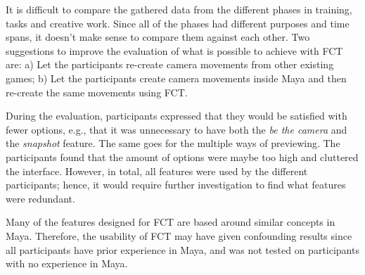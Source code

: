 It is difficult to compare the gathered data from the different phases in training, tasks and creative work. Since all of the phases had different purposes and time spans, it doesn't make sense to compare them against each other. Two suggestions to improve the evaluation of what is possible to achieve with FCT are: a) Let the participants re-create camera movements from other existing games; b) Let the participants create camera movements inside Maya and then re-create the same movements using FCT.

During the evaluation, participants expressed that they would be satisfied with fewer options, e.g., that it was unnecessary to have both the \textit{be the camera} and the \textit{snapshot} feature. The same goes for the multiple ways of previewing. The participants found that the amount of options were maybe too high and cluttered the interface. However, in total, all features were used by the different participants; hence, it would require further investigation to find what features were redundant.

Many of the features designed for FCT are based around similar concepts in Maya. Therefore, the usability of FCT may have given confounding results since all participants have prior experience in Maya, and was not tested on participants with no experience in Maya.

